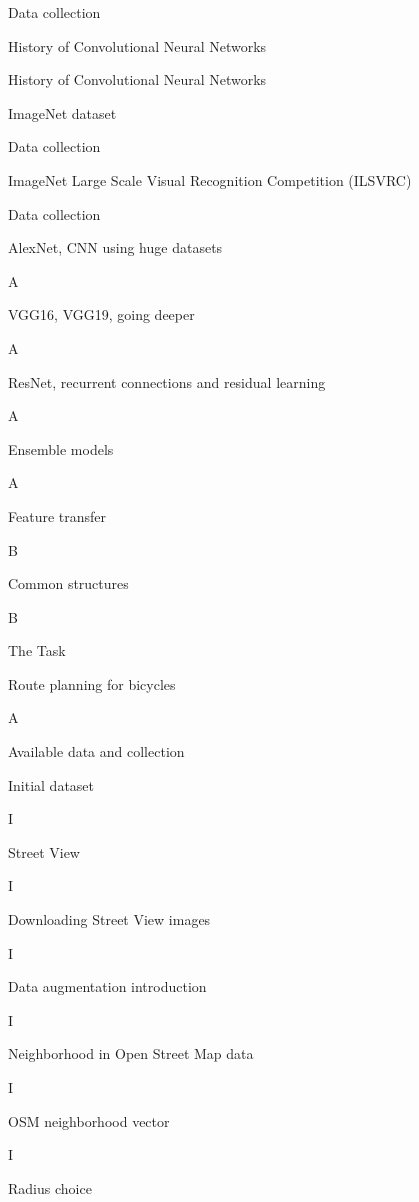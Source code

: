 Data collection


\sec History of Convolutional Neural Networks 

History of Convolutional Neural Networks


\secc ImageNet dataset

Data collection

\secc ImageNet Large Scale Visual Recognition Competition (ILSVRC)

Data collection

\seccc AlexNet, CNN using huge datasets

A

\seccc VGG16, VGG19, going deeper

A

\seccc ResNet, recurrent connections and residual learning

A

\seccc Ensemble models

A

\secc Feature transfer

B

\secc Common structures

B

\chap The Task

\sec Route planning for bicycles 

A

\sec Available data and collection 

\secc Initial dataset

I

\secc Street View

I

\seccc Downloading Street View images

I

\seccc Data augmentation introduction

I

\secc Neighborhood in Open Street Map data

I

\seccc OSM neighborhood vector

I

\seccc Radius choice

